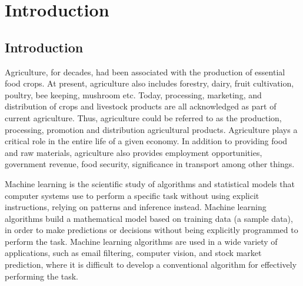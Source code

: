 \documentclass[12pt]{report}
\numberwithin{equation}{section}
\begin{document}
\newpage {}
\renewcommand*{\contentsname}{\centering \Large TABLE OF CONTENTS}
\tableofcontents 

\newpage {}
\renewcommand{\cftfignumwidth}{6em}
\renewcommand{\cftfigpresnum}{Figure }
\listoffigures

\newpage {}
\renewcommand{\cfttabnumwidth}{6em}
\renewcommand{\cfttabpresnum}{Table }
\listoftables


\newpage
{} 

\chapter{Introduction}
\setcounter{section}{-1}   


\section{Introduction}
Agriculture, for decades, had been associated with the production of essential food crops. At present, agriculture also includes forestry, dairy, fruit cultivation, poultry, bee keeping, mushroom etc. Today, processing, marketing, and distribution of crops and livestock products are all acknowledged as part of current agriculture. Thus, agriculture could be referred to as the production, processing, promotion and distribution agricultural products. Agriculture plays a critical role in the entire life of a given economy. In addition to providing food and raw materials, agriculture also provides employment opportunities, government revenue, food security, significance in transport among other things. 

Machine learning is the scientific study of algorithms and statistical models that computer systems use to perform a specific task without using explicit instructions, relying on patterns and inference instead. Machine learning algorithms build a mathematical model based on training data (a sample data), in order to make predictions or decisions without being explicitly programmed to perform the task. Machine learning algorithms are used in a wide variety of applications, such as email filtering, computer vision, and stock market prediction, where it is difficult  to develop a conventional algorithm for effectively performing the task.  
\end{document}
